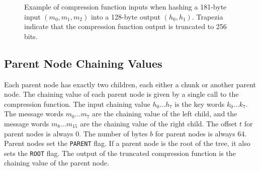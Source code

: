 \documentclass[12pt,notitlepage,a4paper]{article}
\begin{document}
\begin{figure}
\caption{Example of compression function inputs when hashing a 181-byte input $(m_0, m_1, m_2)$ into a 128-byte output $(h_0, h_1)$. Trapezia indicate that the compression function output is truncated to 256 bits.}\label{fig:chunk}
\end{figure}

\subsection{Parent Node Chaining Values}\label{sec:parent}

Each parent node has exactly two children, each either a chunk or another
parent node. The chaining value of each parent node is given by a single call
to the compression function. The input chaining value $h_{0} \ldots h_{7}$ is
the key words $k_{0} \ldots k_{7}$. The message words $m_{0} \ldots m_{7}$ are
the chaining value of the left child, and the message words $m_{8} \ldots
m_{15}$ are the chaining value of the right child. The offset $t$ for parent
nodes is always 0. The number of bytes $b$ for parent nodes is always 64.
Parent nodes set the \texttt{PARENT} flag. If a parent node is the root of the
tree, it also sets the \texttt{ROOT} flag. The output of the truncated
compression function is the chaining value of the parent node.
\end{document}
